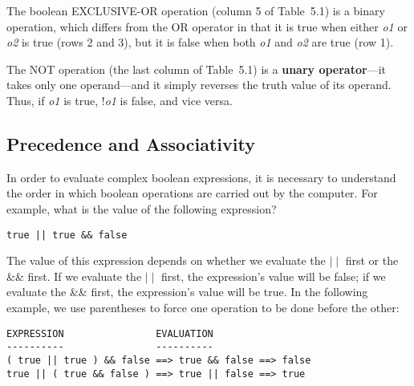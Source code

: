 The boolean EXCLUSIVE-OR operation (column 5 of Table~5.1) is a binary
operation, which differs from the OR operator in that it is true when
either {\it o1} or {\it o2} is true (rows 2 and 3), but it is false
when both {\it o1} and {\it o2} are true (row 1).

The NOT operation (the last column of Table~5.1) is a
{\bf unary operator}---it takes only one operand---and it simply
reverses the truth value of its operand.  Thus, if {\it o1} is true,
!{\it o1} is false, and vice versa.


\label{self-study-exercises}




\subsection{Precedence and Associativity}
\noindent In order to evaluate complex boolean expressions, it is necessary 
to understand the order in which boolean operations are carried out by
the computer.  For example, what is the value of the following
expression?

\begin{jjjlisting}
\begin{lstlisting}
true || true && false
\end{lstlisting}
\end{jjjlisting}

\noindent The value of this expression depends on whether we evaluate
the $\mid\mid$ first or the \&\& first.  If we evaluate the $\mid\mid$
first, the expression's value will be false; if we evaluate the \&\&
first, the expression's value will be true.  In the following example,
we use parentheses to force one operation to be done before the
other:

\begin{jjjlisting}
\begin{lstlisting}
EXPRESSION                EVALUATION
----------                ----------
( true || true ) && false ==> true && false ==> false
true || ( true && false ) ==> true || false ==> true
\end{lstlisting}
\end{jjjlisting}

